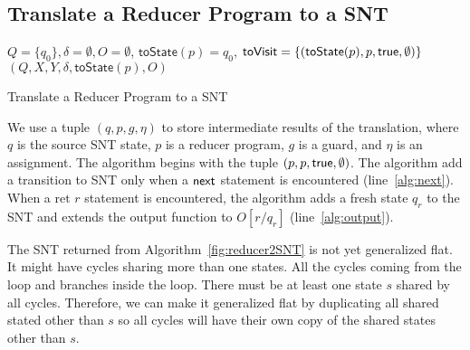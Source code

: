 \begin{appendix}
\section{Translate a Reducer Program to a SNT}
\begin{algorithm}[H]
	$Q=\{q_0\}, \delta=\emptyset, O=\emptyset$, $\mathsf{toState}(p) =q_0$, $\mathsf{toVisit}=\{(\mathsf{toState}(p),p,\mathsf{true},\emptyset)\}$\;
	\Return $(Q,X,Y,\delta, \mathsf{toState}(p),O)$\;
	
	\caption{Translate a Reducer Program to a SNT}
	\label{fig:reducer2SNT}
\end{algorithm}
We use a tuple $(q,p,g,\eta)$ to store intermediate results of the translation, where $q$ is the source SNT state, $p$ is a reducer program, $g$ is a guard, and $\eta$ is an assignment.
The algorithm begins with the tuple $(p,p,\mathsf{true},\emptyset)$. The algorithm add a transition to SNT only when a $\mathsf{next}$ statement is encountered (line~\ref{alg:next}). When a $\mbox{ret }r$ statement is encountered, the algorithm adds a fresh state $q_r$ to the SNT and extends the output function to $O[r/q_r]$ (line~\ref{alg:output}).

The SNT returned from Algorithm~\ref{fig:reducer2SNT} is not yet generalized flat. It might have cycles sharing more than one states. All the cycles coming from the loop and branches inside the loop. There must be at least one state $s$ shared by all cycles. Therefore, we can make it generalized flat by duplicating all shared stated other than $s$ so all cycles will have their own copy of the shared states other than $s$.  




\end{appendix}
